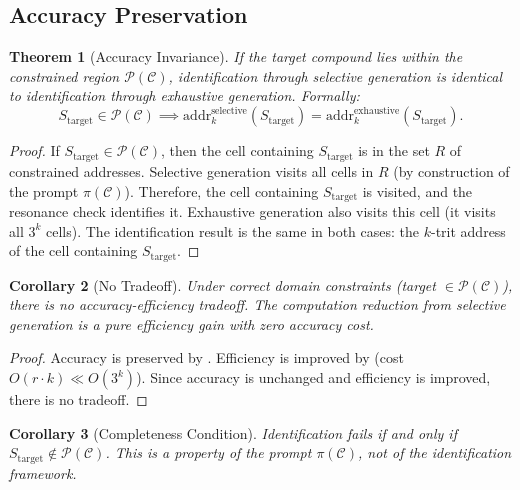 \documentclass[11pt,twocolumn,a4paper]{article}
\newtheorem{theorem}{Theorem}[section]
\newtheorem{corollary}[theorem]{Corollary}
\theoremstyle{definition}
\theoremstyle{remark}
\newcommand{\Purpose}{\mathcal{P}}
\newcommand{\Context}{\mathcal{C}}
\newcommand{\Prompt}{\pi}
\begin{document}
\subsection{Accuracy Preservation}\label{sec:accuracy}

\begin{theorem}[Accuracy Invariance]\label{thm:accuracy-invariance}
If the target compound lies within the constrained region $\Purpose(\Context)$, identification through selective generation is identical to identification through exhaustive generation. Formally:
\begin{equation}
  S_{\mathrm{target}} \in \Purpose(\Context) \implies \mathrm{addr}_k^{\mathrm{selective}}(S_{\mathrm{target}}) = \mathrm{addr}_k^{\mathrm{exhaustive}}(S_{\mathrm{target}}).
\end{equation}
\end{theorem}

\begin{proof}
If $S_{\mathrm{target}} \in \Purpose(\Context)$, then the cell containing $S_{\mathrm{target}}$ is in the set $R$ of constrained addresses. Selective generation visits all cells in $R$ (by construction of the prompt $\Prompt(\Context)$). Therefore, the cell containing $S_{\mathrm{target}}$ is visited, and the resonance check identifies it. Exhaustive generation also visits this cell (it visits all $3^k$ cells). The identification result is the same in both cases: the $k$-trit address of the cell containing $S_{\mathrm{target}}$.
\end{proof}

\begin{corollary}[No Tradeoff]\label{cor:no-tradeoff}
Under correct domain constraints (target $\in \Purpose(\Context)$), there is no accuracy-efficiency tradeoff. The computation reduction from selective generation is a \emph{pure efficiency gain} with zero accuracy cost.
\end{corollary}

\begin{proof}
Accuracy is preserved by . Efficiency is improved by  (cost $O(r \cdot k) \ll O(3^k)$). Since accuracy is unchanged and efficiency is improved, there is no tradeoff.
\end{proof}

\begin{corollary}[Completeness Condition]\label{cor:completeness}
Identification fails if and only if $S_{\mathrm{target}} \notin \Purpose(\Context)$. This is a property of the prompt $\Prompt(\Context)$, not of the identification framework.
\end{corollary}
\end{document}
